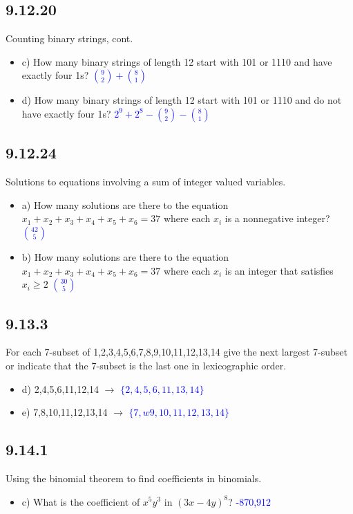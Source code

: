 \documentclass{article}
\begin{document}
\subsection*{9.12.20} Counting binary strings, cont.
\begin{itemize}
    \item c) How many binary strings of length 12 start with 101 or 1110 and have exactly four 1s?
    \textcolor{blue}{$\binom{9}{2} + \binom{8}{1}$}
    \item d) How many binary strings of length 12 start with 101 or 1110 and do not have exactly four 1s?
    \textcolor{blue}{$2^9 + 2^8 - \binom{9}{2} - \binom{8}{1}$}
\end{itemize}

\subsection*{9.12.24} Solutions to equations involving a sum of integer valued variables.
\begin{itemize}
    \item a) How many solutions are there to the equation $x_1 + x_2 + x_3 + x_4 + x_5 + x_6 = 37$ where each $x_i$ is a nonnegative integer?
    \textcolor{blue}{$\binom{42}{5}$}
    \item b) How many solutions are there to the equation $x_1 + x_2 + x_3 + x_4 + x_5 + x_6 = 37$ where each $x_i$ is an integer that satisfies $x_i \ge 2$
    \textcolor{blue}{$\binom{30}{5}$}
\end{itemize}

\subsection*{9.13.3} For each 7-subset of {1,2,3,4,5,6,7,8,9,10,11,12,13,14} give the next largest 7-subset or indicate that the 7-subset is the last one in lexicographic order.
\begin{itemize}
    \item d) {2,4,5,6,11,12,14} $\rightarrow$
    \textcolor{blue}{$\{2,4,5,6,11,13,14\}$}
    \item e) {7,8,10,11,12,13,14} $\rightarrow$
    \textcolor{blue}{$\{7,w9,10,11,12,13,14\}$}
\end{itemize}

\subsection*{9.14.1} Using the binomial theorem to find coefficients in binomials.
\begin{itemize}
    \item c) What is the coefficient of $x^5y^3$ in $(3x - 4y)^8$?
    \textcolor{blue}{-870,912}
\end{itemize}
\end{document}

